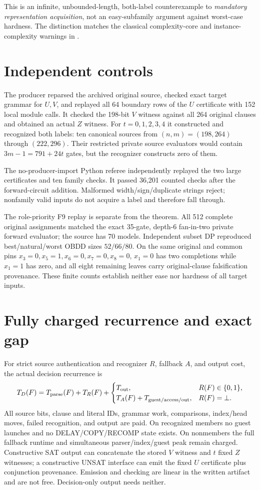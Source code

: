 \documentclass[11pt]{article}
\begin{document}
This is an infinite, unbounded-length, both-label counterexample to
\emph{mandatory representation acquisition}, not an easy-subfamily argument
against worst-case hardness.  The distinction matches the classical
complexity-core and instance-complexity warnings in
\cite{lynch1975,orponen1994}.

\section{Independent controls}
The producer reparsed the archived original source, checked exact target
grammar for $U,V$, and replayed all 64 boundary rows of the $U$ certificate
with 152 local module calls.  It checked the 198-bit $V$ witness against all
264 original clauses and obtained an actual $Z$ witness.  For $t=0,1,2,3,4$
it constructed and recognized both labels: ten canonical sources from
$(n,m)=(198,264)$ through $(222,296)$.  Their restricted private source
evaluators would contain $3m-1=791+24t$ gates, but the recognizer constructs
zero of them.

The no-producer-import Python referee independently replayed the two large
certificates and ten family checks.  It passed 36,201 counted checks after the
forward-circuit addition.  Malformed width/sign/duplicate strings reject;
nonfamily valid inputs do not acquire a label and therefore fall through.

The role-priority F9 replay is separate from the theorem.  All 512 complete
original assignments matched the exact 35-gate, depth-6 fan-in-two private
forward evaluator; the source has 70 models.  Independent subset DP reproduced
best/natural/worst OBDD sizes $52/66/80$.  On the same original and common
pins $x_3=0,x_5=1,x_6=0,x_7=0,x_8=0$, $x_1=0$ has two completions while
$x_1=1$ has zero, and all eight remaining leaves carry original-clause
falsification provenance.  These finite counts establish neither ease nor
hardness of all target inputs.

\section{Fully charged recurrence and exact gap}
For strict source authentication and recognizer $R$, fallback $A$, and output
cost, the actual decision recurrence is
\[
T_D(F)=T_{\rm parse}(F)+T_R(F)+
\begin{cases}
 T_{\rm out},&R(F)\in\{0,1\},\\
 T_A(F)+T_{\rm guest/access/out},&R(F)=\bot.
\end{cases}
\]
All source bits, clause and literal IDs, grammar work, comparisons, index/head
moves, failed recognition, and output are paid.  On recognized members no
guest launches and no DELAY/COPY/RECOMP state exists.  On nonmembers the full
fallback runtime and simultaneous parser/index/guest peak remain charged.
Constructive SAT output can concatenate the stored $V$ witness and $t$ fixed
$Z$ witnesses; a constructive UNSAT interface can emit the fixed $U$
certificate plus conjunction provenance.  Emission and checking are linear
in the written artifact and are not free.  Decision-only output needs neither.
\end{document}
